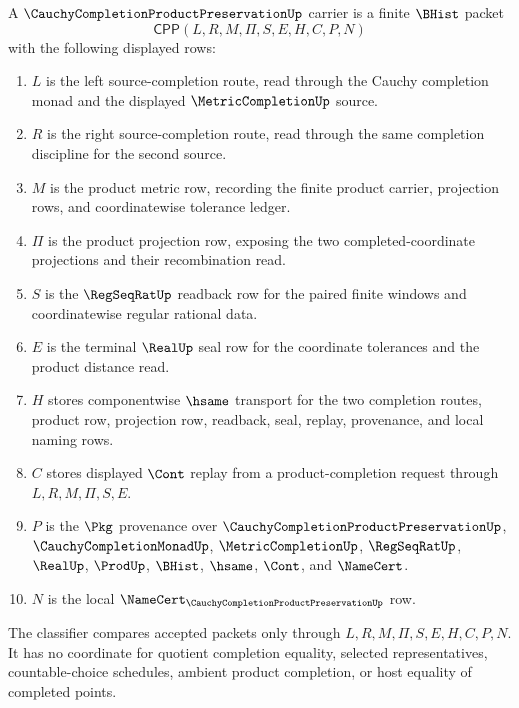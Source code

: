 \begin{definition}
\label{def:cauchy-completion-product-preservation-carrier}
A $\CauchyCompletionProductPreservationUp$ carrier is a finite $\BHist$ packet
$$
\mathsf{CPP}(L,R,M,\Pi,S,E,H,C,P,N)
$$
with the following displayed rows:
\begin{enumerate}
\item $L$ is the left source-completion route, read through the Cauchy completion monad and the displayed $\MetricCompletionUp$ source.
\item $R$ is the right source-completion route, read through the same completion discipline for the second source.
\item $M$ is the product metric row, recording the finite product carrier, projection rows, and coordinatewise tolerance ledger.
\item $\Pi$ is the product projection row, exposing the two completed-coordinate projections and their recombination read.
\item $S$ is the $\RegSeqRatUp$ readback row for the paired finite windows and coordinatewise regular rational data.
\item $E$ is the terminal $\RealUp$ seal row for the coordinate tolerances and the product distance read.
\item $H$ stores componentwise $\hsame$ transport for the two completion routes, product row, projection row, readback, seal, replay, provenance, and local naming rows.
\item $C$ stores displayed $\Cont$ replay from a product-completion request through $L,R,M,\Pi,S,E$.
\item $P$ is the $\Pkg$ provenance over $\CauchyCompletionProductPreservationUp$, $\CauchyCompletionMonadUp$, $\MetricCompletionUp$, $\RegSeqRatUp$, $\RealUp$, $\ProdUp$, $\BHist$, $\hsame$, $\Cont$, and $\NameCert$.
\item $N$ is the local $\NameCert_{\CauchyCompletionProductPreservationUp}$ row.
\end{enumerate}
The classifier compares accepted packets only through $L,R,M,\Pi,S,E,H,C,P,N$. It has no coordinate for quotient completion equality, selected representatives, countable-choice schedules, ambient product completion, or host equality of completed points.
\end{definition}

